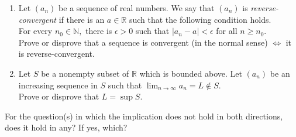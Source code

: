 \documentclass{article}
\begin{document}
\begin{enumerate}
	\item Let $(a_n)$ be a sequence of real numbers. We say that $(a_n)$ is \emph{reverse-convergent} if there is an $a \in \mathbb{R}$ such that the following condition holds.\\
	For every $n_0 \in \mathbb{N},$ there is $\epsilon > 0$ such that $|a_n - a| < \epsilon$ for all $n \ge n_0.$\\
	Prove or disprove that a sequence is convergent (in the normal sense) $\iff$ it is reverse-convergent.
	\item Let $S$ be a nonempty subset of $\mathbb{R}$ which is bounded above. Let $(a_n)$ be an increasing sequence in $S$ such that $\displaystyle\lim_{n\to \infty}a_n = L \not\in S.$\\
	 Prove or disprove that $L = \sup S.$ 
\end{enumerate}
For the question(s) in which the implication does not hold in both directions, does it hold in any? If yes, which?
\end{document}
